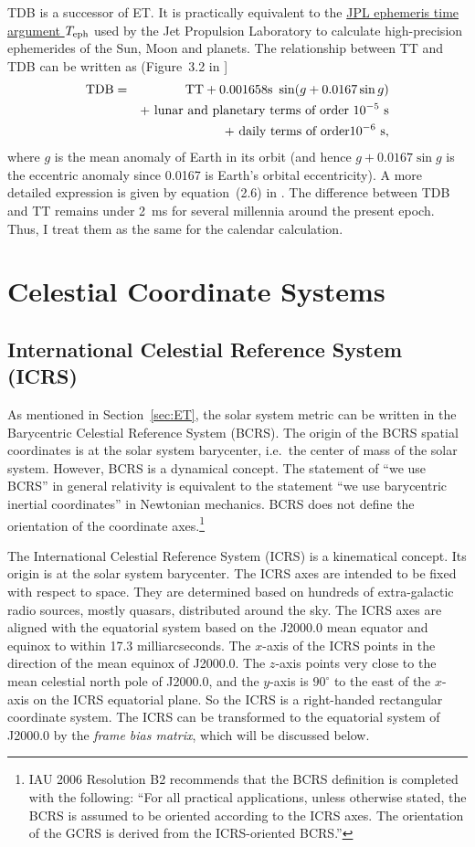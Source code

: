 \documentclass[12pt]{article}
\newcommand \beqn {\begin{eqnarray}}
\newcommand \eeqn {\end{eqnarray}}
\newcommand{\expl}{\cite{expl}}
\newcommand{\kaplan}{\cite{kaplan05}}
\begin{document}
\begin{CJK}{UTF8}{bkai}
TDB is a successor of ET. It is practically equivalent to the 
\href{https://en.wikipedia.org/wiki/Ephemeris_time#JPL_ephemeris_time_argument_Teph}{JPL ephemeris time argument $T_{\rm eph}$} 
used by the Jet Propulsion Laboratory to calculate high-precision ephemerides of 
the Sun, Moon and planets. The relationship between TT and TDB 
can be written as (Figure~3.2 in \expl ] 
\beqn
  {\rm TDB} &=& {\rm TT} + 0.001658{\rm s}~\sin(g + 0.0167\sin g) \cr 
&& + \mbox{ lunar and planetary terms of order } 10^{-5}~{\rm s} \cr 
&& + \mbox{ daily terms of order} 10^{-6}~{\rm s} , 
\eeqn
where $g$ is the mean anomaly of Earth in its orbit (and hence $g+0.0167\sin g$ is the 
eccentric anomaly since 0.0167 is Earth's orbital eccentricity). 
A more detailed expression is given by equation~(2.6) in 
\kaplan. The difference 
between TDB and TT remains under 2~ms for several millennia around the 
present epoch. Thus, I treat them as the same for the calendar calculation.

\section{Celestial Coordinate Systems}
\label{sec:coordSys}

\subsection{International Celestial Reference System (ICRS)} 

As mentioned in Section~\ref{sec:ET}, the solar system metric can be 
written in the Barycentric Celestial Reference System (BCRS). The origin of the 
BCRS spatial coordinates is at the solar system barycenter, i.e.\ the center 
of mass of the solar system. However, BCRS is a dynamical concept. The 
statement of ``we use BCRS'' in general relativity is equivalent to the 
statement ``we use barycentric inertial coordinates'' in Newtonian 
mechanics. BCRS does not define the orientation of the coordinate axes.\footnote{IAU 2006 
Resolution B2 recommends that the BCRS definition is completed with the 
following: ``For all practical applications, unless otherwise
stated, the BCRS is assumed to be oriented according to the ICRS axes. 
The orientation of the GCRS is derived from the ICRS-oriented BCRS.''}

The International Celestial Reference System (ICRS) is a kinematical concept. Its 
origin is at the solar system barycenter. The ICRS axes are intended to be 
fixed with respect to space. They are 
determined based on hundreds of extra-galactic radio sources, mostly quasars, distributed 
around the sky. The ICRS axes are aligned with the equatorial system based on 
the J2000.0 mean equator and equinox to within 17.3 milliarcseconds. The $x$-axis 
of the ICRS points in the direction of the mean equinox of J2000.0. The $z$-axis 
points very close to the mean celestial north pole of J2000.0, and the $y$-axis 
is $90^\circ$ to the east of the $x$-axis on the ICRS equatorial plane. So the ICRS 
is a right-handed rectangular coordinate system. The ICRS can be transformed to the 
equatorial system of J2000.0 by the {\em frame bias matrix}, which will be 
discussed below.


\end{CJK}
\end{document}
